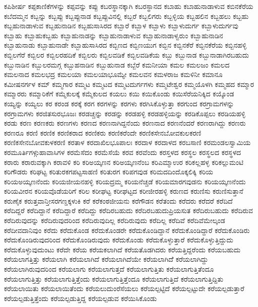 {ಕಪಿಶೀರ್ಷ
ಕಪ್ಪಕಾಣಿಕೆಗಳನ್ನು
ಕಪ್ಪವನ್ನು
ಕಪ್ಪು
ಕಬರಸ್ಥಾನಕ್ಕಾಗಿ
ಕಬರಸ್ಥಾನದ
ಕಬಾಹು
ಕಬಾಹುನಾಡಾಳುವ
ಕಬಿನಕೆರೆಯ
ಕಬೆದಮ್ಮನ
ಕಬ್ಬನ್ನು
ಕಬ್ಬಪ್ಪು
ಕಬ್ಬಪ್ಪುನಾಡ
ಕಬ್ಬಪ್ಪುವಿನಲ್ಲಿ
ಕಬ್ಬರೆ
ಕಬ್ಬಲಿಗರು
ಕಬ್ಬಳ್ಳಿಯ
ಕಬ್ಬಹಲಿನ
ಕಬ್ಬಹಲು
ಕಬ್ಬಹು
ಕಬ್ಬಹುನಾಡಾಳುವ
ಕಬ್ಬಹುನಾಡಿನ
ಕಬ್ಬಹುಸಾಸಿರದ
ಕಬ್ಬಾರೆ
ಕಬ್ಬಾಳ
ಕಬ್ಬಾಳು
ಕಬ್ಬಾಳುದುರ್ಗ
ಕಬ್ಬಾಳುದುರ್ಗವು
ಕಬ್ಬಾಹು
ಕಬ್ಬಾಹುಕಬ್ಬಹು
ಕಬ್ಬಾಹುನಾಡನ್ನು
ಕಬ್ಬಾಹುನಾಡಾಳುವ
ಕಬ್ಬಾಹುನಾಡಾಳ್ವರುಂ
ಕಬ್ಬಾಹುನಾಡಿನ
ಕಬ್ಬಾಹುನಾಡು
ಕಬ್ಬಾಹುನಾಡೇ
ಕಬ್ಬಾಹುಸಾಸಿರದ
ಕಬ್ಬಿಣದ
ಕಬ್ಬಿಣಯುಗ
ಕಬ್ಬಿನ
ಕಬ್ಬಿನಕೆರೆ
ಕಬ್ಬಿನಕೆರೆಯ
ಕಬ್ಬಿನಹಳ್ಳಿ
ಕಬ್ಬಿಲಗೆರೆ
ಕಬ್ಬಿಲರ
ಕಬ್ಬಿಲರಹದಿಕೆ
ಕಬ್ಬಿಲರು
ಕಬ್ಬಿಲವಡಿಕೆ
ಕಬ್ಬಿಲವಡಿಕೆಯ
ಕಬ್ಬು
ಕಬ್ಬುನಾಡ
ಕಬ್ಬುನಾಡಾಗಿರಬಹುದು
ಕಬ್ಬುನಾಡಿನ
ಕಬ್ಬುಲರಮಗ್ಗ
ಕಬ್ಬುಹನಾಡಿನ
ಕಬ್ಬುಹುನಾಡ
ಕಬ್ಬೆರೆ
ಕಮನೀಯಾ
ಕಮಲ
ಕಮಲಜಂ
ಕಮಲದ
ಕಮಲನಾದ
ಕಮಲಭದ್ರ
ಕಮಲಯಾ
ಕಮಲಯಾಭೂಮ್ಯೇ
ಕಮಲವನ
ಕಮಳರಾಜ
ಕಮಳಿನೀ
ಕಮಾನೂ
ಕಮೀಷನರ್ಗಳ
ಕಮ್
ಕಮ್ಮಗಾರ
ಕಮ್ಮಟ
ಕಮ್ಮಟದ
ಕಮ್ಮಟದುರ್ಗಗಳು
ಕಮ್ಮಟೇಶ್ವರ
ಕಮ್ಮಯೊಳಗಿ
ಕಮ್ಮಹದ
ಕಮ್ಮಾರ
ಕಮ್ಮಾರರು
ಕಮ್ಮಾರಿಕೆಗೆ
ಕಮ್ಮೆಕುಲಕ್ಕೆ
ಕಮ್ಮೆಕುಲದ
ಕಯಲು
ಕಯಿ
ಕಯಿಕೊಂಡು
ಕಯಿಸೆರೆಯನಿಕ್ಕಿದ
ಕಯ್ಕೊಂಡ
ಕಯ್ಯನ್ನು
ಕಯ್ಯಲು
ಕರ
ಕರಂಡ
ಕರಕ್ಕೆ
ಕರಗ
ಕರಗಳನ್ನು
ಕರಗಳು
ಕರಗಿಸಿಕೊಳ್ಳುತ್ತಾ
ಕರಗುಂದ
ಕರಗ್ರಾಮಗಳನ್ನು
ಕರಗ್ರಾಮಗಳು
ಕರಜಿತಸುರಭೂಜಃ
ಕರಡಚ್ಚನ್ನು
ಕರಡನ್ನು
ಕರಡಹಳ್ಳಿ
ಕರಡಹಳ್ಳಿಯನ್ನು
ಕರಡಿಕೊಪ್ಪಲು
ಕರಡಿಯಹಳ್ಳಿ
ಕರಡು
ಕರಣ
ಕರಣಕರು
ಕರಣಗಳು
ಕರಣದ
ಕರಣನಾಗಿದ್ದನೆಂದು
ಕರಣನಾದ
ಕರಣನೆಂದರೆ
ಕರಣರಾಗಿದ್ದು
ಕರಣರು
ಕರಣರೂ
ಕರಣಿ
ಕರಣಿಕ
ಕರಣಿಕರಾದ
ಕರಣಿಕರು
ಕರಣಿಕರೆಂದೇ
ಕರಣಿಕಸೇನಬೋವಕುಲಕರಣಿ
ಕರಣಿಕಸೇನಬೋವಕುಳಕರಣಿ
ಕರತಾಳ
ಕರದಾಖಿಲಭೂಪಾಲಃ
ಕರದಾಳ
ಕರದಾಳದ
ಕರಬಸಾಣಿ
ಕರಮಂಡಲಸ್ವಾಮಿಯ
ಕರಮೂರ್ತಿಗಳ್ಗುಹಾವಾಸಿಗಳ
ಕರಮೆಸೆದಂ
ಕರಮೆಸೆಯೆ
ಕರವ
ಕರವೆಂದು
ಕರಸ್ತಳದ
ಕರಸ್ಥಲ
ಕರಸ್ಥಲದ
ಕರಸ್ಥಳದ
ಕರಾರು
ಕರಾರುವಕ್ಕಾಗಿ
ಕರಾವಳಿ
ಕರಿ
ಕರಿಅಯ್ಕಣನ
ಕರಿಅಯ್ಕಣನೆಂಬ
ಕರಿಎಮ್ಮಾಉರ
ಕರಿಕಲ್ಲಹಳ್ಳ
ಕರಿಕಲ್ಲುಮಂಟಿ
ಕರಿಗೌಡರು
ಕರಿಘಟ್ಟ
ಕರಿತುರಕಗಪಟ್ಟಸಾಹಣಿ
ಕರಿತುರಗ
ಕರಿಪಗವುಡ
ಕರಿಮದದಿಂದೊಕ್ಕಲಿಕ್ಕಿ
ಕರಿಯ
ಕರಿಯಅಯ್ಕಣನೆಂದು
ಕರಿಯಜೀಯನಹಳ್ಳಿ
ಕರಿಯದ್ರಮ್ಮ
ಕರಿಯನೆಚ್ಚಡೆ
ಕರಿಯಮಾರಗವುಡನು
ಕರಿಯಯ್ಕಣನೆಂದು
ಕರಿಯವೀರನ
ಕರಿಯವೊಡೆಯರಿಗೆ
ಕರಿಲ
ಕರೀಘಟ್ಟ
ಕರೀಘಟ್ಟದ
ಕರೀಜೀರಹಳ್ಳಿ
ಕರುಣದ
ಕರುಣಿಸು
ಕರುಣಿಸುತ್ತಾನೆ
ಕರುಣೈಕ
ಕರುತ್ತವಾನ್ತೀಸರಗಣ್ಡಕ್ಕಳುಕಿ
ಕರೆ
ಕರೆಕಂಠಜೀಯನು
ಕರೆಗೌಡನ
ಕರೆತಂದು
ಕರೆದರು
ಕರೆದರೆ
ಕರೆದಿದೆ
ಕರೆದಿದ್ದರೆ
ಕರೆದಿದ್ದಾನೆ
ಕರೆದಿದ್ದಾರೆ
ಕರೆದಿದ್ದು
ಕರೆದಿರಬಹುದು
ಕರೆದಿರಬಹುದುಪ್ರಿಯಸುತ
ಕರೆದಿರುಬಹುದು
ಕರೆದಿರುವ
ಕರೆದಿರುವುದನ್ನು
ಕರೆದಿರುವುದರಿಂದ
ಕರೆದಿರುವುದಿಲ್ಲ
ಕರೆದಿರುವುದು
ಕರೆದಿಲ್ಲ
ಕರೆದಿವೆ
ಕರೆದಿವೆಮೇಲ್ಕಂಡ
ಕರೆದೀವದಾನಿವುಂ
ಕರೆದು
ಕರೆದುಕೊಂಡ
ಕರೆದುಕೊಂಡರೇ
ಕರೆದುಕೊಂಡಿದ್ದಾನೆ
ಕರೆದುಕೊಂಡಿದ್ದಾರೆ
ಕರೆದುಕೊಂಡಿರು
ಕರೆದುಕೊಂಡಿರುವುದರಿಂದ
ಕರೆದುಕೊಂಡಿರುವುದು
ಕರೆದುಕೊಂಡು
ಕರೆದುಕೊಳ್ಳುತ್ತಾರೆ
ಕರೆದುಕೊಳ್ಳುತ್ತಿದ್ದುದು
ಕರೆದುಕೊಳ್ಳುವುದುಂಟು
ಕರೆದೇ
ಕರೆಯ
ಕರೆಯಕಲಾಗಿದೆ
ಕರೆಯತೊಡಗಿದರು
ಕರೆಯತ್ತಿದ್ದರೆಂದು
ಕರೆಯಬಹುದು
ಕರೆಯಲಾಗತ್ತಿತ್ತು
ಕರೆಯಲಾಗಿ
ಕರೆಯಲಾಗಿದೆ
ಕರೆಯಲಾಗಿದೆಯೇ
ಕರೆಯಲಾಗಿದೆೆ
ಕರೆಯಲಾಗಿದ್ದು
ಕರೆಯಲಾಗಿರುವುದರಿಂದ
ಕರೆಯಲಾಗು
ಕರೆಯಲಾಗುತ್ತದೆ
ಕರೆಯಲಾಗುತ್ತಿತು
ಕರೆಯಲಾಗುತ್ತಿತೆಂದೂ
ಕರೆಯಲಾಗುತ್ತಿತ್ತು
ಕರೆಯಲಾಗುತ್ತಿತ್ತೆಂದು
ಕರೆಯಲಾಗುತ್ತಿತ್ತೆಂದೂ
ಕರೆಯಲಾಗುತ್ತಿದೆ
ಕರೆಯಲಾಗುತ್ತಿದ್ದಿತು
ಕರೆಯಲಾಯಿತು
ಕರೆಯಲಾಯಿತೆಂದು
ಕರೆಯಲುದುಂರೆಸೆಯಲು
ಕರೆಯಲ್ಪಟ್ಟಿದೆ
ಕರೆಯಲ್ಪಟ್ಟುದೇ
ಕರೆಯಲ್ಪಡುತ್ತಾರೆ
ಕರೆಯಲ್ಪಡುತ್ತಿತ್ತೆಂದು
ಕರೆಯಲ್ಪಡುತ್ತಿದ್ದ
ಕರೆಯಲ್ಪಡುವ
ಕರೆಯಿಸಿಕೊಂಡು
}
